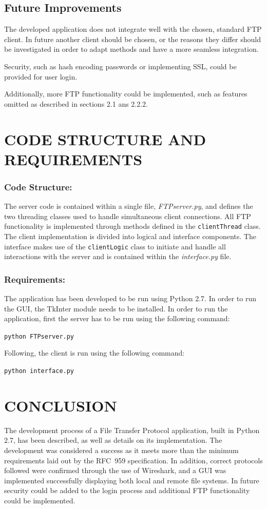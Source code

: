 \documentclass[10pt,twocolumn]{witseiepaper}
\begin{document}
\subsection{Future Improvements}
The developed application does not integrate well with the chosen, standard FTP client. In future another client should be chosen, or the reasons they differ should be investigated in order to adapt methods and have a more seamless integration.

Security, such as hash encoding passwords or implementing SSL, could be provided for user login.

Additionally, more FTP functionality could be implemented, such as features omitted as described in sections 2.1 ans 2.2.2.
\section{CODE STRUCTURE AND REQUIREMENTS}

\subsubsection*{Code Structure: } The server code is contained within a single file, \textit{FTPserver.py}, and defines the two threading classes used to handle simultaneous client connections. All FTP functionality is implemented through methods defined in the \texttt{clientThread} class. The client implementation is divided into logical and interface components. The interface makes use of the \texttt{clientLogic} class to initiate and handle all interactions with the server and is contained within the \textit{interface.py} file.  
 
\subsubsection*{Requirements: }
The application has been developed to be run using Python 2.7. In order to run the GUI, the TkInter module needs to be installed. In order to run the application, first the server has to be run using the following command:

\texttt{python FTPserver.py}

Following, the client is run using the following command:

\texttt{python interface.py}


\section{CONCLUSION}
The development process of a File Transfer Protocol application, built in Python 2.7, has been described, as well as details on its implementation. The development was considered a success as it meets more than the minimum requirements laid out by the RFC~959 specification. In addition, correct protocols followed were confirmed through the use of Wireshark, and a GUI was implemented successfully displaying both local and remote file systems. In future security could be added to the login process and additional FTP functionality could be implemented.
\end{document}
